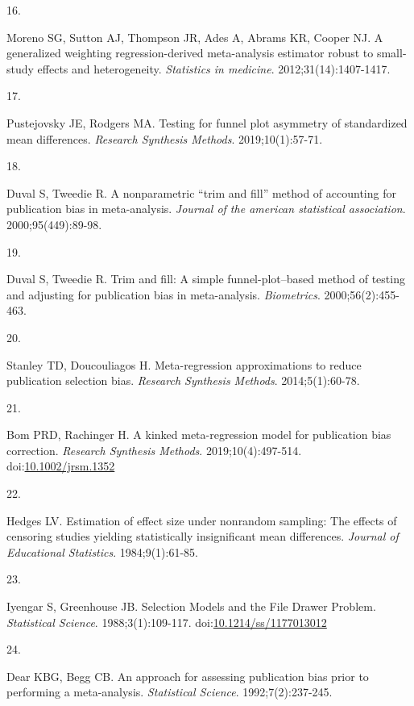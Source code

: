 \documentclass[
  man, donotrepeattitle,floatsintext]{apa7}
\newlength{\cslhangindent}
\newlength{\csllabelwidth}
\newenvironment{CSLReferences}[2] %
 {\begin{list}{}{%
  \setlength{\itemindent}{0pt}
  \setlength{\leftmargin}{0pt}
  \setlength{\parsep}{0pt}
  \ifodd #1
   \setlength{\leftmargin}{\cslhangindent}
   \setlength{\itemindent}{-1\cslhangindent}
  \fi
  \setlength{\itemsep}{#2\baselineskip}}}
 {\end{list}}
\newcommand{\CSLLeftMargin}[1]{\parbox[t]{\csllabelwidth}{\strut#1\strut}}
\newcommand{\CSLRightInline}[1]{\parbox[t]{\linewidth - \csllabelwidth}{\strut#1\strut}}
\begin{document}
\begin{CSLReferences}{0}{1}
\CSLLeftMargin{16. }%
\CSLRightInline{Moreno SG, Sutton AJ, Thompson JR, Ades A, Abrams KR, Cooper NJ. A generalized weighting regression-derived meta-analysis estimator robust to small-study effects and heterogeneity. \emph{Statistics in medicine}. 2012;31(14):1407-1417.}

\CSLLeftMargin{17. }%
\CSLRightInline{Pustejovsky JE, Rodgers MA. Testing for funnel plot asymmetry of standardized mean differences. \emph{Research Synthesis Methods}. 2019;10(1):57-71.}

\CSLLeftMargin{18. }%
\CSLRightInline{Duval S, Tweedie R. A nonparametric {``trim and fill''} method of accounting for publication bias in meta-analysis. \emph{Journal of the american statistical association}. 2000;95(449):89-98.}

\CSLLeftMargin{19. }%
\CSLRightInline{Duval S, Tweedie R. Trim and fill: A simple funnel-plot--based method of testing and adjusting for publication bias in meta-analysis. \emph{Biometrics}. 2000;56(2):455-463.}

\CSLLeftMargin{20. }%
\CSLRightInline{Stanley TD, Doucouliagos H. Meta-regression approximations to reduce publication selection bias. \emph{Research Synthesis Methods}. 2014;5(1):60-78.}

\CSLLeftMargin{21. }%
\CSLRightInline{Bom PRD, Rachinger H. A kinked meta-regression model for publication bias correction. \emph{Research Synthesis Methods}. 2019;10(4):497-514. doi:\href{https://doi.org/10.1002/jrsm.1352}{10.1002/jrsm.1352}}

\CSLLeftMargin{22. }%
\CSLRightInline{Hedges LV. Estimation of effect size under nonrandom sampling: The effects of censoring studies yielding statistically insignificant mean differences. \emph{Journal of Educational Statistics}. 1984;9(1):61-85.}

\CSLLeftMargin{23. }%
\CSLRightInline{Iyengar S, Greenhouse JB. Selection {Models} and the {File} {Drawer} {Problem}. \emph{Statistical Science}. 1988;3(1):109-117. doi:\href{https://doi.org/10.1214/ss/1177013012}{10.1214/ss/1177013012}}

\CSLLeftMargin{24. }%
\CSLRightInline{Dear KBG, Begg CB. {An approach for assessing publication bias prior to performing a meta-analysis}. \emph{Statistical Science}. 1992;7(2):237-245.}


\end{CSLReferences}
\end{document}
